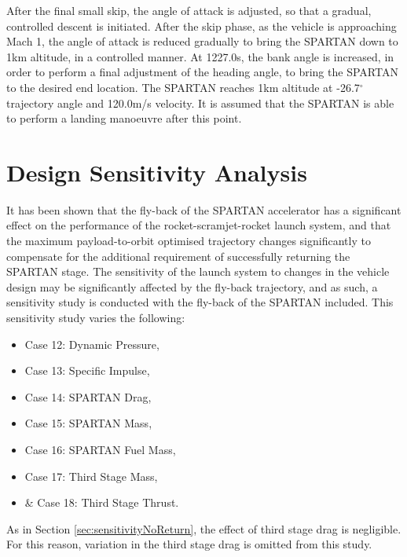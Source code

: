 After the final small skip, the angle of attack is adjusted, so that a gradual, controlled descent is initiated. 
After the skip phase, as the vehicle is approaching Mach 1, the angle of attack is reduced gradually to bring the SPARTAN down to 1km altitude, in a controlled manner. At 1227.0s, the bank angle is increased, in order to perform a final adjustment of the heading angle, to bring the SPARTAN to the desired end location. 
The SPARTAN reaches 1km altitude at -26.7$^\circ$ trajectory angle and 120.0m/s velocity. It is assumed that the SPARTAN is able to perform a landing manoeuvre after this point. 








\section{Design Sensitivity Analysis}

It has been shown that the fly-back of the SPARTAN accelerator has a significant effect on the performance of the rocket-scramjet-rocket launch system, and that the maximum payload-to-orbit optimised trajectory changes significantly to compensate for the additional requirement of successfully returning the SPARTAN stage. The sensitivity of the launch system to changes in the vehicle design may be significantly affected by the fly-back trajectory, and as such, a sensitivity study is conducted with the fly-back of the SPARTAN included. This sensitivity study varies the following:
\begin{itemize}
	\item Case 12: Dynamic Pressure, 
	\item Case 13: Specific Impulse,
	\item Case 14: SPARTAN Drag,
	\item Case 15: SPARTAN Mass,
	\item Case 16: SPARTAN Fuel Mass,
	\item Case 17: Third Stage Mass,
	\item \& Case 18: Third Stage Thrust.
\end{itemize}
As in Section \ref{sec:sensitivityNoReturn}, the effect of third stage drag is negligible. For this reason, variation in the third stage drag is omitted from this study. 




